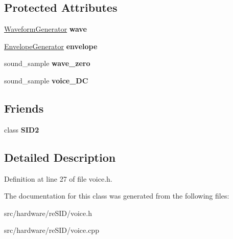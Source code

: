\subsection*{Protected Attributes}
\begin{DoxyCompactItemize}
\item 
\hypertarget{classVoice_a02f6bab907e521aaad704cfc1ed8d57a}{\hyperlink{classWaveformGenerator}{Waveform\-Generator} {\bfseries wave}}\label{classVoice_a02f6bab907e521aaad704cfc1ed8d57a}

\item 
\hypertarget{classVoice_a27b15cd974227c33c944c52e1579cb0e}{\hyperlink{classEnvelopeGenerator}{Envelope\-Generator} {\bfseries envelope}}\label{classVoice_a27b15cd974227c33c944c52e1579cb0e}

\item 
\hypertarget{classVoice_a9abac6af13c012181b5daf582a5847f4}{sound\-\_\-sample {\bfseries wave\-\_\-zero}}\label{classVoice_a9abac6af13c012181b5daf582a5847f4}

\item 
\hypertarget{classVoice_a1b0f969d64f7acf92126ffd323eb6fe0}{sound\-\_\-sample {\bfseries voice\-\_\-\-D\-C}}\label{classVoice_a1b0f969d64f7acf92126ffd323eb6fe0}

\end{DoxyCompactItemize}
\subsection*{Friends}
\begin{DoxyCompactItemize}
\item 
\hypertarget{classVoice_a906a1c7f73b30e819416802226bba3ff}{class {\bfseries S\-I\-D2}}\label{classVoice_a906a1c7f73b30e819416802226bba3ff}

\end{DoxyCompactItemize}


\subsection{Detailed Description}


Definition at line 27 of file voice.\-h.



The documentation for this class was generated from the following files\-:\begin{DoxyCompactItemize}
\item 
src/hardware/re\-S\-I\-D/voice.\-h\item 
src/hardware/re\-S\-I\-D/voice.\-cpp\end{DoxyCompactItemize}

